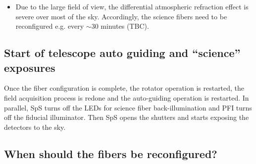 \documentclass[a4paper]{article}
\begin{document}
\begin{itemize}
  criteria are different among the three main science areas in the
  plan of PFS SSP survey\cite{takada14}, all are planning to acquire
  data with no beam-switching to blank sky. (The instrument control
  system will however accommodate the beam switching capability as an
  option.)  This will maximize the on-source integration time over the
  observing time and minimize the geometric constraints in the
  allocation of science fibers to science targets\footnote{In
    cross-beam switching observations, two fibers are assigned to one
    science target and the telescope pointing is dithered between one
    exposure and another so that in the first exposure one of the
    fibers is placed on the target and the other observes blank sky,
    and in the next exposure, they switch the role. This way, 100\% of
    the exposure time can be used for on-source integration, but the
    fibers can be significantly less flexibly allocated to targets.}.
 \item Due to the large field of view, the differential atmospheric
   refraction effect is severe over most of the sky. Accordingly, the
   science fibers need to be reconfigured e.g. every $\sim$30 minutes
   (TBC).
\end{itemize}

\subsection{Start of telescope auto guiding and ``science'' exposures\label{sec:detail_ope_plan:science_exposure}}

Once the fiber configuration is complete, the rotator operation is
restarted, the field acquisition process is redone and the
auto-guiding operation is restarted. In parallel, SpS turns off the
LEDs for science fiber back-illumination and PFI turns off the
fiducial illuminator. Then SpS opens the shutters and starts exposing
the detectors to the sky.

\subsection{When should the fibers be reconfigured?}
\end{document}
